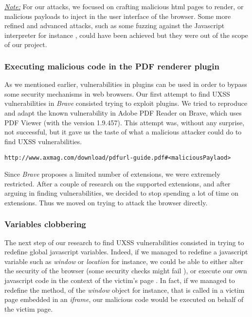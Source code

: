 \documentclass[journal]{IEEEtran}
\begin{document}
\medskip

\underline{\emph{Note:}} For our attacks, we focused on crafting malicious html pages to render, or malicious payloads to inject in the user interface of the browser. Some more refined and advanced attacks, such as some fuzzing  against the Javascript interpreter for instance \cite{microsoftFuzzingOnv8}, could have been achieved but they were out of the scope of our project.

\subsubsection*{Executing malicious code in the PDF renderer plugin}

As we mentioned earlier, vulnerabilities in plugins can be used in order to bypass some security mechanisms in web browsers. Our first attempt to find UXSS vulnerabilities in \emph{Brave} consisted trying to exploit plugins. We tried to reproduce and adapt the known vulnerability in Adobe PDF Reader \cite{uxssPDF} on Brave, which uses PDF Viewer (with the version 1.9.457). This attempt was, without any surprise, not successful, but it gave us the taste of what a malicious attacker could do to find UXSS vulnerabilities.

\begin{lstlisting}[caption=The pattern we tried to use to execute malicious javascript using the PDF viewer]
http://www.axmag.com/download/pdfurl-guide.pdf#<maliciousPaylaod>
\end{lstlisting}

\medskip

Since \emph{Brave} proposes a limited number of extensions, we were extremely restricted. After a couple of research on the supported extensions, and after arguing in finding vulnerabilities, we decided to stop spending a lot of time on extensions. Thus we moved on trying to attack the browser directly.

\subsubsection*{Variables clobbering}

The next step of our research to find UXSS vulnerabilities consisted in trying to redefine global javascript variables. Indeed, if we managed to redefine a javascript variable such as \emph{window} or \emph{location} for instance, we could be able to either alter the security of the browser (some security checks might fail \cite{frameBustingLocationClubbered}), or execute our own javascript code in the context of the victim's page \cite{uxssJSLeaks}. In fact, if we managed to redefine the method, of the \emph{window} object for instance, that is called in a victim page embedded in an \emph{iframe}, our malicious code would be executed on behalf of the victim page. 
\end{document}
